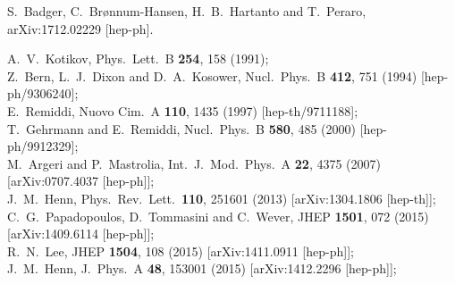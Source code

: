 \documentclass[aps,prd,preprint,groupedaddress,nofootinbib,showpacs,eqsecnum]{revtex4}
\begin{document}
\begin{thebibliography}{99}
S.~Badger, C.~Brønnum-Hansen, H.~B.~Hartanto and T.~Peraro,
arXiv:1712.02229 [hep-ph].

A.~V.~Kotikov,
Phys.\ Lett.\ B {\bf 254}, 158 (1991);\\
Z.~Bern, L.~J.~Dixon and D.~A.~Kosower,
Nucl.\ Phys.\ B {\bf 412}, 751 (1994)
[hep-ph/9306240]; \\
E.~Remiddi,
Nuovo Cim.\ A {\bf 110}, 1435 (1997)
[hep-th/9711188];\\
T.~Gehrmann and E.~Remiddi,
Nucl.\ Phys.\  B {\bf 580}, 485 (2000)
[hep-ph/9912329];\\
M.~Argeri and P.~Mastrolia,
Int.\ J.\ Mod.\ Phys.\ A {\bf 22}, 4375 (2007)
[arXiv:0707.4037 [hep-ph]];\\
J.~M.~Henn,
Phys.\ Rev.\ Lett.\  {\bf 110}, 251601 (2013)
[arXiv:1304.1806 [hep-th]];\\
C.~G.~Papadopoulos, D.~Tommasini and C.~Wever,
JHEP {\bf 1501}, 072 (2015)
[arXiv:1409.6114 [hep-ph]];\\
R.~N.~Lee,
JHEP {\bf 1504}, 108 (2015)
[arXiv:1411.0911 [hep-ph]];\\
J.~M.~Henn,
J.\ Phys.\ A {\bf 48}, 153001 (2015)
[arXiv:1412.2296 [hep-ph]];\\

\end{thebibliography}
\end{document}
